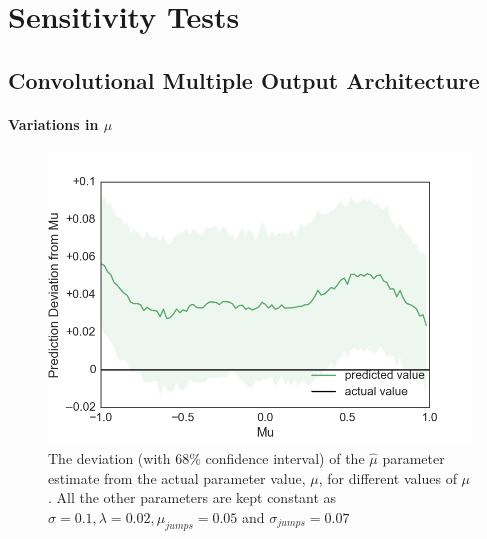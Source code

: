 \documentclass[11pt,oneside,openany,a4paper,english, report, goldenblock
]{usthesis}
\begin{document}
\chapter[Appendix B]{Sensitivity Tests}
\label{appendix:sensitivity_tests}

\section{Convolutional Multiple Output Architecture}
\subsubsection{Variations in $\mu$}
\begin{figure}[!htb]
	\centering
	\includegraphics[width=0.7\linewidth]{Images/Output-Sensitivity-Results/ConvolutionalNN-MultipleOutput-ELU/Varying-Mu/Mu}
	\caption{The deviation (with $68\%$ confidence interval) of the $\hat{\mu}$ parameter estimate from the actual parameter value, $\mu$, for different values of $\mu$. All the other parameters are kept constant as $\sigma = 0.1, \lambda = 0.02, \mu_{jumps} = 0.05$ and $\sigma_{jumps} = 0.07$}
	\label{fig:appendix:sensitivity_test:multiple_output:varying_mu:mu}
\end{figure}
\end{document}
